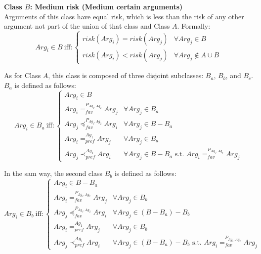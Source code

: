 \textbf{Class $B$: Medium risk (Medium certain arguments)}\\
Arguments of this class have equal risk, which is less than the risk of any other argument not part of the union of that class and
Class $A$. Formally:
\begin{equation}
Arg_i \in B~ \text{iff}:
\begin{cases}
risk(Arg_i) = risk (Arg_j) & \forall Arg_j \in B
\\
risk(Arg_i) < risk(Arg_j) & \forall Arg_j \notin A \cup B
\end{cases}
\end{equation}

As for Class $A$, this class is composed of three disjoint subclasses: $B_a$, $B_b$, and $B_c$. $B_a$ is defined as follows:
\begin{equation}
Arg_i \in B_a~ \text{iff}:
\begin{cases}
Arg_i \in B
\\
Arg_i =_{fav}^{P_{Ag_1, Ag_2}} Arg_j & \forall Arg_j \in B_a
\\
Arg_j \preceq_{fav}^{P_{Ag_1, Ag_2}} Arg_i & \forall Arg_j \in
B-B_a
\\
Arg_i =_{pref}^{Ag_1} Arg_j & \forall Arg_j \in B_a
\\
Arg_j \prec_{pref}^{Ag_1} Arg_i & \forall Arg_j \in B-B_a
\text{~s.t.~} Arg_i =_{fav}^{P_{Ag_1, Ag_2}} Arg_j
\end{cases}
\end{equation}


In the sam way, the second class $B_b$ is defined as follows:
\begin{equation}
Arg_i \in B_b~ \text{iff}:
\begin{cases}
Arg_i \in B-B_a
\\
Arg_i =_{fav}^{P_{Ag_1, Ag_2}} Arg_j & \forall Arg_j \in B_b
\\
Arg_j \preceq_{fav}^{P_{Ag_1, Ag_2}} Arg_i & \forall Arg_j \in
(B-B_a)-B_b
\\
Arg_i =_{pref}^{Ag_1} Arg_j & \forall Arg_j \in B_b
\\
Arg_j \prec_{pref}^{Ag_1} Arg_i & \forall Arg_j \in (B-B_a)-B_b
\text{~s.t.~} Arg_i =_{fav}^{P_{Ag_1, Ag_2}} Arg_j
\end{cases}
\end{equation}

